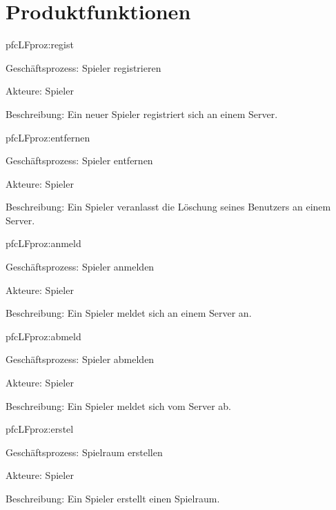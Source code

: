 \chapter{Produktfunktionen}

\setcounter{pfc}{10}

\begin{description}[leftmargin=5em, style=sameline]

	\begin{lhp}{pfc}{LF}{proz:regist}
		\item [Geschäftsprozess:] Spieler registrieren
		\item [Akteure:] Spieler
		\item [Beschreibung:] Ein neuer Spieler registriert sich an einem Server.
	\end{lhp}

	\begin{lhp}{pfc}{LF}{proz:entfernen}
		\item [Geschäftsprozess:] Spieler entfernen
		\item [Akteure:] Spieler
		\item [Beschreibung:] Ein Spieler veranlasst die Löschung seines Benutzers an einem Server.
	\end{lhp}
	
	\begin{lhp}{pfc}{LF}{proz:anmeld}
		\item [Geschäftsprozess:] Spieler anmelden
		\item [Akteure:] Spieler
		\item [Beschreibung:] Ein Spieler meldet sich an einem Server an.
	\end{lhp}

	\begin{lhp}{pfc}{LF}{proz:abmeld}
		\item [Geschäftsprozess:] Spieler abmelden
		\item [Akteure:] Spieler
		\item [Beschreibung:] Ein Spieler meldet sich vom Server ab.
	\end{lhp}

	\begin{lhp}{pfc}{LF}{proz:erstel}
		\item [Geschäftsprozess:] Spielraum erstellen
		\item [Akteure:] Spieler
		\item [Beschreibung:] Ein Spieler erstellt einen Spielraum.
	\end{lhp}
	

\end{description}
